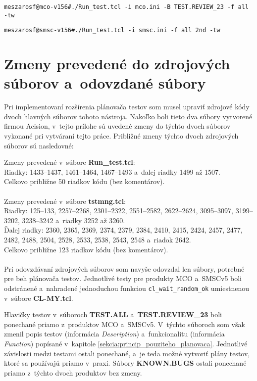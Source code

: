 \begin{lstlisting}[caption=Spúšťanie regresných testov v~produkte MCO
,label=priklad:prilohy_regresie_mco]
meszarosf@mco-v156#./Run_test.tcl -i mco.ini -B TEST.REVIEW_23 -f all -tw
\end{lstlisting}


\begin{lstlisting}[caption=Spúšťanie regresných testov v~produkte SMSCv5
,label=priklad:prilohy_regresie_smsc]
meszarosf@smsc-v156#./Run_test.tcl -i smsc.ini -f all 2nd -tw
\end{lstlisting}



%
%
\chapter{Zmeny prevedené do zdrojových súborov a~odovzdané súbory}
\label{priloha:zmeny_do_zdrojakov}
Pri implementovaní rozšírenia plánovača testov som musel upraviť zdrojové
kódy dvoch hlavných súborov tohoto nástroja. 
Nakoľko boli tieto dva súbory vytvorené firmou Acision, v~tejto prílohe
sú uvedené zmeny do týchto dvoch súborov vykonané pri vytváraní tejto
práce. Približné zmeny týchto dvoch zdrojových súborov sú nasledovné:

\noindent Zmeny prevedené v~súbore \textbf{Run\_test.tcl}: \\
Riadky: 1433--1437, 1461--1464, 1467--1493 a~ďalej riadky 1499 až 1507.\\
Celkovo približne 50 riadkov kódu (bez komentárov).
\\
\\
\noindent Zmeny prevedené v~súbore \textbf{tstmng.tcl}: \\
Riadky: 125--133, 2257--2268, 2301--2322, 2551--2582, 2622--2624, 
3095--3097, 3199--3202, 3238--3242 a~riadky 3252 až 3260. \\
Ďalej riadky: 2360, 2365, 2369, 2374, 2379, 2384, 2410, 2415, 2424, 
2457, 2477, 2482, 2488, 2504, 2528, 2533, 2538, 2543, 2548 a~riadok 2642. \\
Celkovo približne 123 riadkov kódu (bez komentárov).
\\
\\
Pri odovzdávaní zdrojových súborov som navyše odovzdal len súbory,
potrebné pre beh plánovača testov. Jednotlivé testy pre produkty MCO
a~SMSCv5 boli odstránené a~nahradené jednoduchou funkciou 
\texttt{cl\_wait\_random\_ok} umiestnenou v~súbore \textbf{CL-MY.tcl}. 

Hlavičky testov v~súboroch \textbf{TEST.ALL} a~\textbf{TEST.REVIEW\_23} 
boli ponechané priamo z~produktov MCO a~SMSCv5. V~týchto súboroch som 
však zmenil popis testov (informácia \textit{Description}) 
a~funkcionalitu (informácia \textit{Function}) popísané v~kapitole 
\ref{sekcia:princip_pouziteho_planovaca}.
Jednotlivé závislosti medzi testami ostali ponechané, a~je teda možné 
vytvoriť plány testov, ktoré sa používajú priamo v~praxi.
Súbory \textbf{KNOWN.BUGS} ostali ponechané priamo z~týchto dvoch 
produktov bez zmeny. 

